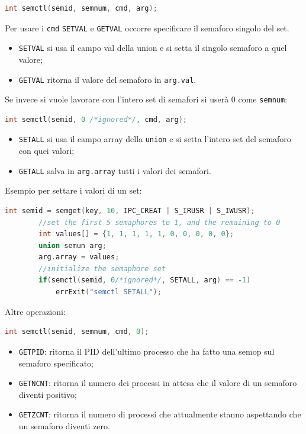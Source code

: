 \documentclass[a4paper, 12pt]{book}
\begin{document}
    \begin{lstlisting}[language=C]
        int semctl(semid, semnum, cmd, arg);
    \end{lstlisting}
    Per usare i \verb|cmd| \verb|SETVAL| e \verb|GETVAL|
    occorre specificare il semaforo singolo del set.
    \begin{itemize}
        \item \verb|SETVAL| si usa il campo val della 
        union e si setta il singolo semaforo a quel 
        valore;
        \item \verb|GETVAL| ritorna il valore del 
        semaforo in \verb|arg.val|.
    \end{itemize}
    Se invece si vuole lavorare con l'intero set di semafori si userà 0 
    come \verb|semnum|:
    \begin{lstlisting}[language=C]
        int semctl(semid, 0 /*ignored*/, cmd, arg);
    \end{lstlisting}
    \begin{itemize}
        \item \verb|SETALL| si usa il campo array della 
        \verb|union| e si setta l'intero set del semaforo
        con quei valori;
        \item \verb|GETALL| salva in \verb|arg.array| tutti 
        i valori dei semafori.
    \end{itemize}
    Esempio per settare i valori di un set:
    \begin{lstlisting}[language=C]
        int semid = semget(key, 10, IPC_CREAT | S_IRUSR | S_IWUSR);
        //set the first 5 semaphores to 1, and the remaining to 0
        int values[] = {1, 1, 1, 1, 1, 0, 0, 0, 0, 0};
        union semun arg;
        arg.array = values;
        //initialize the semaphore set 
        if(semctl(semid, 0/*ignored*/, SETALL, arg) == -1)
            errExit("semctl SETALL");
    \end{lstlisting}
    Altre operazioni:
    \begin{lstlisting}[language=C]
        int semctl(semid, semnum, cmd, 0);
    \end{lstlisting}
    \begin{itemize}
        \item \verb|GETPID|: ritorna il PID dell'ultimo 
        processo che ha fatto una semop sul semaforo specificato;
        \item \verb|GETNCNT|: ritorna il numero dei processi 
        in attesa che il valore di un semaforo diventi positivo;
        \item \verb|GETZCNT|: ritorna il numero di processi che 
        attualmente stanno aspettando che un semaforo diventi 
        zero.
    \end{itemize}
    
\end{document}
